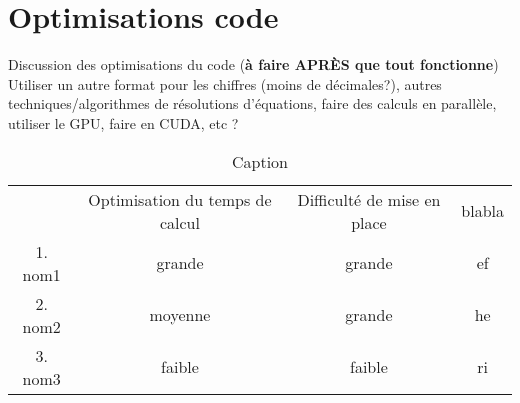 \chapter{Optimisations code}
\label{chaper-5}

Discussion des optimisations du code (\textbf{à faire APRÈS que tout fonctionne})\\

Utiliser un autre format pour les chiffres (moins de décimales?), autres techniques/algorithmes de résolutions d'équations, faire des calculs en parallèle, utiliser le GPU, faire en CUDA, etc ?\\

\begin{table}[h]
    \centering
    \begin{tabular}{c|c|c|c|}
         & Optimisation du temps de calcul & Difficulté de mise en place & blabla\\
         1. nom1 & grande & grande & ef\\
         2. nom2 & moyenne & grande & he\\
         3. nom3 & faible & faible & ri\\
    \end{tabular}
    \caption{Caption}
    \label{tab:my_table}
\end{table}